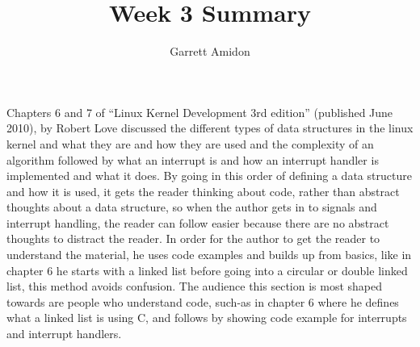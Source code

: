 \documentclass[a4paper]{article}
\title{Week 3 Summary}
\author{Garrett Amidon}
\begin{document}
\maketitle




\paragraph{}

Chapters 6 and 7 of “Linux Kernel Development 3rd edition” (published June 2010), by Robert Love discussed the different types of data structures in the linux kernel and what they are and how they are used and the complexity of an algorithm followed by what an interrupt is and how an interrupt handler is implemented and what it does. By going in this order of defining a data structure and how it is used, it gets the reader thinking about code, rather than abstract thoughts about a data structure, so when the author gets in to signals and interrupt handling, the reader can follow easier because there are no abstract thoughts to distract the reader. In order for the author to get the reader to understand the material, he uses code examples and builds up from basics, like in chapter 6 he starts with a linked list before going into a circular or double linked list, this method avoids confusion. The audience this section is most shaped towards are people who understand code, such-as in chapter 6 where he defines what a linked list is using C, and follows by showing code example for interrupts and interrupt handlers.
\end{document}
